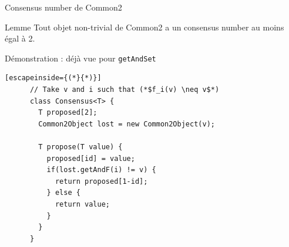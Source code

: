 
\begingroup

\begin{frame}[fragile]{Consensus number de Common2}
  \begin{block}{Lemme}
    Tout objet non-trivial de Common2 a un consensus number au moins égal à 2.
  \end{block}
  \begin{block}{Démonstration : déjà vue pour \lstinline{getAndSet}}
    \begin{lstlisting}[escapeinside={(*}{*)}]
      // Take v and i such that (*$f_i(v) \neq v$*)
      class Consensus<T> {
        T proposed[2];
        Common2Object lost = new Common2Object(v);
        
        T propose(T value) {
          proposed[id] = value;
          if(lost.getAndF(i) != v) {
            return proposed[1-id];
          } else {
            return value;
          }
        }
      }
    \end{lstlisting}
  \end{block}
\end{frame}

\endgroup
\endinput
